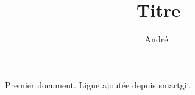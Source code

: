 \documentclass[a4paper, french, 12pt]{article}
\title{Titre}
\author{André~\bsc{Dewèvre}}
\date{}
\begin{document}
\maketitle

Premier document.
Ligne ajoutée depuis smartgit
\end{document}
